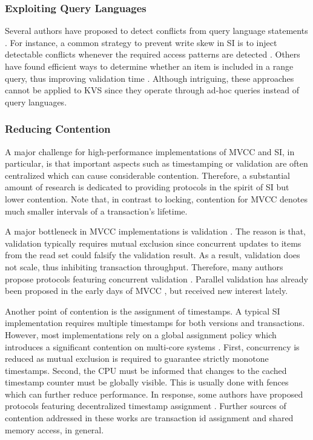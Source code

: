 \subsubsection{Exploiting Query Languages}

Several authors have proposed to detect conflicts from query language statements
\cite{fekete2005making, faleiro2015rethinking, neumann2015fast}. For instance, a
common strategy to prevent write skew in SI is to inject detectable conflicts
whenever the required access patterns are detected \cite{fekete2005making}.
Others have found efficient ways to determine whether an item is included in a
range query, thus improving validation time \cite{neumann2015fast}. Although
intriguing, these approaches cannot be applied to KVS since they operate through
ad-hoc queries instead of query languages.

\subsubsection{Reducing Contention}

A major challenge for high-performance implementations of MVCC and SI, in
particular, is that important aspects such as timestamping or validation are
often centralized which can cause considerable contention. Therefore, a
substantial amount of research is dedicated to providing protocols in the spirit
of SI but lower contention. Note that, in contrast to locking, contention for
MVCC denotes much smaller intervals of a transaction's lifetime.

A major bottleneck in MVCC implementations is validation \cite{tu2013speedy,
bailey2013exploring, ding2015centiman, faleiro2015rethinking,
wang2017efficiently, zhou2017posterior}. The reason is that, validation
typically requires mutual exclusion since concurrent updates to items from the
read set could falsify the validation result. As a result, validation does not
scale, thus inhibiting transaction throughput. Therefore, many authors propose
protocols featuring concurrent validation \cite{bailey2013exploring,
ding2015centiman, faleiro2015rethinking, wang2017efficiently}. Parallel
validation has already been proposed in the early days of MVCC
\cite{kung1981optimistic}, but received new interest lately.

Another point of contention is the assignment of timestamps. A typical SI
implementation requires multiple timestamps for both versions and transactions.
However, most implementations rely on a global assignment policy which
introduces a significant contention on multi-core systems \cite{tu2013speedy,
zhou2017posterior}. First, concurrency is reduced as mutual exclusion is
required to guarantee strictly monotone timestamps. Second, the CPU must be
informed that changes to the cached timestamp counter must be globally visible.
This is usually done with fences which can further reduce performance. In
response, some authors have proposed protocols featuring decentralized timestamp
assignment \cite{tu2013speedy, zhou2017posterior}. Further sources of contention
addressed in these works are transaction id assignment and shared memory access,
in general.

